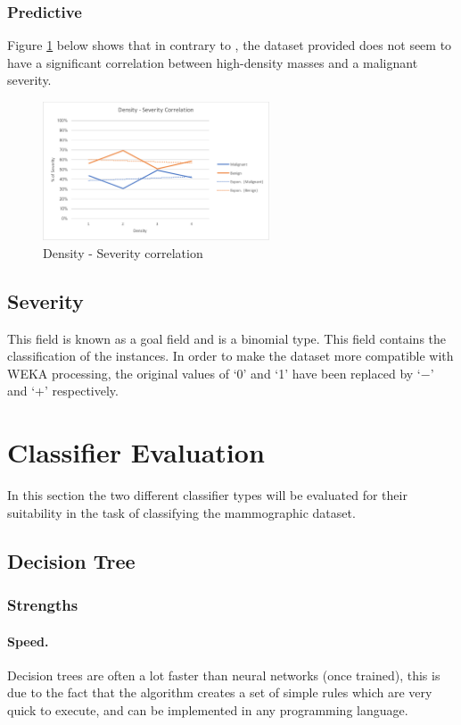 \documentclass[12pt]{article}
\begin{document}
      \subsubsection{Predictive}
        Figure \ref{fig:density-severity-correlation} below shows that in contrary to \cite{woods2011mammographic}, the dataset provided does not seem to have a significant correlation between high-density masses and a malignant severity.


        \begin{figure}[H]
          \centering
          \includegraphics[width=0.6\textwidth]{density-severity-correlation}
          \caption{Density - Severity correlation}
          \label{fig:density-severity-correlation}
        \end{figure}

    \subsection{Severity}
      This field is known as a goal field and is a binomial type. This field contains the classification of the instances. In order to make the dataset more compatible with WEKA processing, the original values of ‘0’ and ‘1’ have been replaced by ‘$-$’ and ‘+’ respectively.

\section{Classifier Evaluation}
  In this section the two different classifier types will be evaluated for their suitability in the task of classifying the mammographic dataset.

  \subsection{Decision Tree}
    \subsubsection{Strengths}
      \paragraph{Speed.}
        Decision trees are often a lot faster than neural networks (once trained), this is due to the fact that the algorithm creates a set of simple rules which are very quick to execute, and can be implemented in any programming language.
\end{document}
